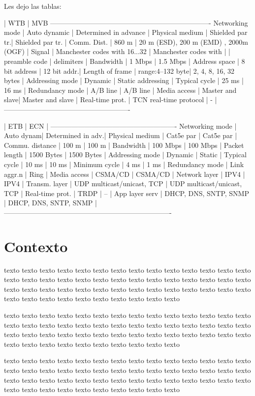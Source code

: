 \documentclass[
11pt, %
]{charter}
\begin{document}
Les dejo las tablas:

| WTB | MVB
----------------------------------------------------------------------
Networking mode | Auto  dynamic | Determined in advance |
Physical medium | Shielded par tr.| Shielded par tr. |
Comm. Dist. | 860 m | 20 m (ESD), 200 m (EMD) , 2000m (OGF) |
Signal | Manchester codes with 16...32 | Manchester codes with |
| preamble code | delimiters |
Bandwidth | 1 Mbps | 1.5 Mbps |
Address space | 8 bit address | 12 bit addr.|
Length of frame | range:4–132 byte| 2, 4, 8, 16, 32 bytes |
Addressing mode | Dynamic | Static addressing |
Typical cycle | 25 ms | 16 ms |
Redundancy mode | A/B line | A/B line |
Media access | Master and slave| Master and slave |
Real-time prot. | TCN real-time protocol | - |
-------------------------------------------------------

| ETB | ECN |
-------------------------------------------------------
Networking mode | Auto  dynam| Determined in adv.|
Physical medium | Cat5e par   | Cat5e par  |
Commu. distance | 100 m | 100 m  |
Bandwidth | 100 Mbps | 100 Mbps  |
Packet length | 1500 Bytes | 1500 Bytes  |
Addressing mode | Dynamic | Static  |
Typical cycle | 10 ms | 10 ms |
Minimum cycle | 4 ms | 1 ms |
Redundancy mode | Link aggr.n | Ring |
Media access | CSMA/CD | CSMA/CD |
Network layer | IPV4 | IPV4 |
Transm. layer | UDP multicast/unicast, TCP | UDP multicast/unicast, TCP |
Real-time prot. | TRDP | – |
App layer serv | DHCP, DNS, SNTP, SNMP | DHCP, DNS, SNTP, SNMP |
-------------------------------------------------------------------------
\pagebreak
\section{Contexto}

texto texto texto texto texto texto texto texto texto texto texto texto texto texto texto texto texto texto texto texto texto texto texto texto texto texto texto texto texto texto texto texto texto texto texto texto texto texto texto texto texto texto texto texto texto texto texto texto texto texto texto texto 

texto texto texto texto texto texto texto texto texto texto texto texto texto texto texto texto texto texto texto texto texto texto texto texto texto texto texto texto texto texto texto texto texto texto texto texto texto texto texto texto texto texto texto texto texto texto texto texto texto texto texto texto 

texto texto texto texto texto texto texto texto texto texto texto texto texto texto texto texto texto texto texto texto texto texto texto texto texto texto texto texto texto texto texto texto texto texto texto texto texto texto texto texto texto texto texto texto texto texto texto texto texto texto texto texto 
\end{document}
